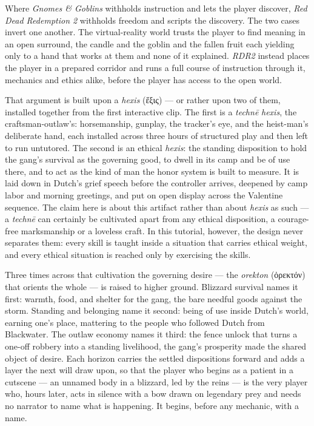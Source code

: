 \documentclass{article}
\newcommand{\gk}[1]{{\greekfont #1}}
\begin{document}
\bigskip


Where \textit{Gnomes \& Goblins} withholds instruction and lets the player discover, \textit{Red Dead Redemption 2} withholds freedom and scripts the discovery. The two cases invert one another. The virtual-reality world trusts the player to find meaning in an open surround, the candle and the goblin and the fallen fruit each yielding only to a hand that works at them and none of it explained. \textit{RDR2} instead places the player in a prepared corridor and runs a full course of instruction through it, mechanics and ethics alike, before the player has access to the open world.

That argument is built upon a \textit{hexis} (\gk{ἕξις}) — or rather upon two of them, installed together from the first interactive clip. The first is a \textit{technē} \textit{hexis}, the craftsman-outlaw's: horsemanship, gunplay, the tracker's eye, and the heist-man's deliberate hand, each installed across three hours of structured play and then left to run untutored. The second is an ethical \textit{hexis}: the standing disposition to hold the gang's survival as the governing good, to dwell in its camp and be of use there, and to act as the kind of man the honor system is built to measure. It is laid down in Dutch's grief speech before the controller arrives, deepened by camp labor and morning greetings, and put on open display across the Valentine sequence. The claim here is about this artifact rather than about \textit{hexis} as such — a \textit{technē} can certainly be cultivated apart from any ethical disposition, a courage-free marksmanship or a loveless craft. In this tutorial, however, the design never separates them: every skill is taught inside a situation that carries ethical weight, and every ethical situation is reached only by exercising the skills.

Three times across that cultivation the governing desire — the \textit{orekton} (\gk{ὀρεκτόν}) that orients the whole — is raised to higher ground. Blizzard survival names it first: warmth, food, and shelter for the gang, the bare needful goods against the storm. Standing and belonging name it second: being of use inside Dutch's world, earning one's place, mattering to the people who followed Dutch from Blackwater. The outlaw economy names it third: the fence unlock that turns a one-off robbery into a standing livelihood, the gang's prosperity made the shared object of desire. Each horizon carries the settled dispositions forward and adds a layer the next will draw upon, so that the player who begins as a patient in a cutscene — an unnamed body in a blizzard, led by the reins — is the very player who, hours later, acts in silence with a bow drawn on legendary prey and needs no narrator to name what is happening. It begins, before any mechanic, with a name.
\end{document}
